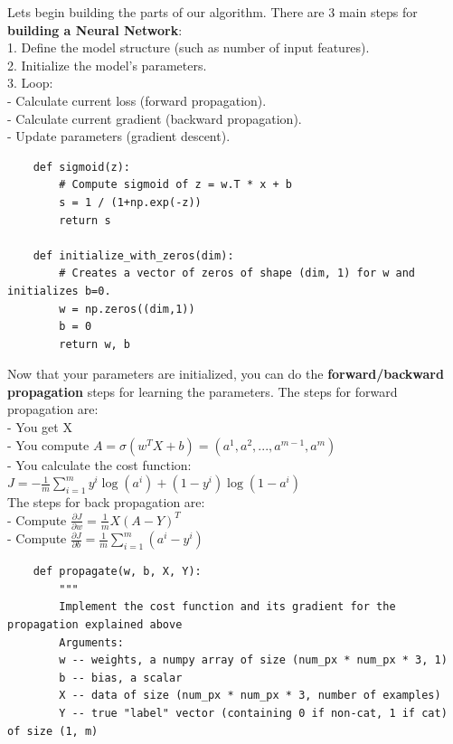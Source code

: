 \documentclass[11pt, a4paper]{article}
\begin{document}
\begin{spacing}{1.1}
	Lets begin building the parts of our algorithm. There are 3 main steps for \textbf{building a Neural Network}: \\
	\hspace*{3mm} 1. Define the model structure (such as number of input features). \\
	\hspace*{3mm} 2. Initialize the model's parameters. \\
	\hspace*{3mm} 3. Loop: \\
	\hspace*{7mm} - Calculate current loss (forward propagation). \\
	\hspace*{7mm} - Calculate current gradient (backward propagation). \\
	\hspace*{7mm} - Update parameters (gradient descent). \newpage

	\begin{lstlisting}
	def sigmoid(z):
		# Compute sigmoid of z = w.T * x + b
		s = 1 / (1+np.exp(-z))
		return s
	
	def initialize_with_zeros(dim):
		# Creates a vector of zeros of shape (dim, 1) for w and initializes b=0.
		w = np.zeros((dim,1))
		b = 0
		return w, b \end{lstlisting} \vspace*{1mm} 
	Now that your parameters are initialized, you can do the \textbf{forward/backward propagation} steps for learning the parameters. The steps for forward propagation are: \vspace*{1mm} \\
	\hspace*{3mm} - You get X \\
	\hspace*{3mm} - You compute $A = \sigma(w^T X + b) = (a^{1}, a^{2}, ..., a^{m-1}, a^{m})$ \\
	\hspace*{3mm} - You calculate the cost function: $J = -\frac{1}{m}\sum_{i=1}^{m}y^{i}\log(a^{i})+(1-y^{i})\log(1-a^{i})$  \vspace*{2mm} \\
	The steps for back propagation are: \vspace*{1mm} \\
	\hspace*{3mm} - Compute $ \frac{\partial J}{\partial w} = \frac{1}{m}X(A-Y)^T$ \vspace*{1mm}\\
	\hspace*{3mm} - Compute $ \frac{\partial J}{\partial b} = \frac{1}{m} \sum_{i=1}^m (a^{i}-y^{i})$
	\begin{lstlisting}
	def propagate(w, b, X, Y):
		"""
		Implement the cost function and its gradient for the propagation explained above
		Arguments:
		w -- weights, a numpy array of size (num_px * num_px * 3, 1)
		b -- bias, a scalar
		X -- data of size (num_px * num_px * 3, number of examples)
		Y -- true "label" vector (containing 0 if non-cat, 1 if cat) of size (1, m)
		

\end{lstlisting}
\end{spacing}
\end{document}
